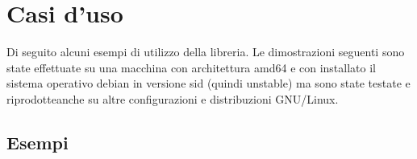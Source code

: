 

\chapter{Casi d'uso}                %
\lhead[\fancyplain{}{\bfseries\thepage}]{\fancyplain{}{\bfseries\rightmark}}
Di seguito alcuni esempi di utilizzo della libreria.
Le dimostrazioni seguenti sono state effettuate su una macchina con architettura amd64 e con installato il sistema operativo debian in versione sid (quindi unstable) ma sono state testate e riprodotteanche su altre configurazioni e distribuzioni GNU/Linux.

\section{Esempi}                 %

\clearpage{\pagestyle{empty}\cleardoublepage} 

